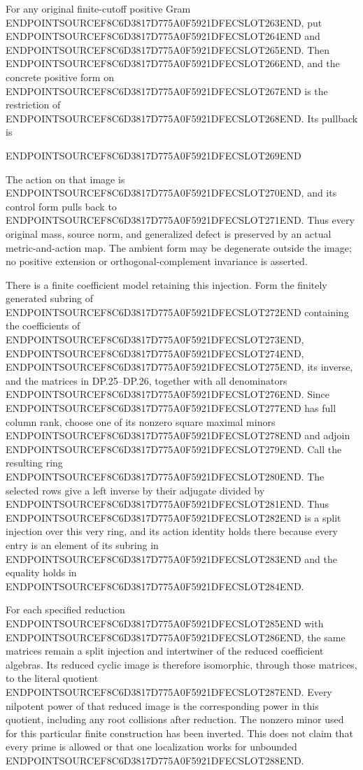 For any original finite-cutoff positive Gram ENDPOINTSOURCEF8C6D3817D775A0F5921DFECSLOT263END, put ENDPOINTSOURCEF8C6D3817D775A0F5921DFECSLOT264END and ENDPOINTSOURCEF8C6D3817D775A0F5921DFECSLOT265END. Then ENDPOINTSOURCEF8C6D3817D775A0F5921DFECSLOT266END, and the concrete positive form on ENDPOINTSOURCEF8C6D3817D775A0F5921DFECSLOT267END is the restriction of ENDPOINTSOURCEF8C6D3817D775A0F5921DFECSLOT268END. Its pullback is

ENDPOINTSOURCEF8C6D3817D775A0F5921DFECSLOT269END

The action on that image is ENDPOINTSOURCEF8C6D3817D775A0F5921DFECSLOT270END, and its control form pulls back to ENDPOINTSOURCEF8C6D3817D775A0F5921DFECSLOT271END. Thus every original mass, source norm, and generalized defect is preserved by an actual metric-and-action map. The ambient form may be degenerate outside the image; no positive extension or orthogonal-complement invariance is asserted.

There is a finite coefficient model retaining this injection. Form the finitely generated subring of ENDPOINTSOURCEF8C6D3817D775A0F5921DFECSLOT272END containing the coefficients of ENDPOINTSOURCEF8C6D3817D775A0F5921DFECSLOT273END, ENDPOINTSOURCEF8C6D3817D775A0F5921DFECSLOT274END, ENDPOINTSOURCEF8C6D3817D775A0F5921DFECSLOT275END, its inverse, and the matrices in DP.25--DP.26, together with all denominators ENDPOINTSOURCEF8C6D3817D775A0F5921DFECSLOT276END. Since ENDPOINTSOURCEF8C6D3817D775A0F5921DFECSLOT277END has full column rank, choose one of its nonzero square maximal minors ENDPOINTSOURCEF8C6D3817D775A0F5921DFECSLOT278END and adjoin ENDPOINTSOURCEF8C6D3817D775A0F5921DFECSLOT279END. Call the resulting ring ENDPOINTSOURCEF8C6D3817D775A0F5921DFECSLOT280END. The selected rows give a left inverse by their adjugate divided by ENDPOINTSOURCEF8C6D3817D775A0F5921DFECSLOT281END. Thus ENDPOINTSOURCEF8C6D3817D775A0F5921DFECSLOT282END is a split injection over this very ring, and its action identity holds there because every entry is an element of its subring in ENDPOINTSOURCEF8C6D3817D775A0F5921DFECSLOT283END and the equality holds in ENDPOINTSOURCEF8C6D3817D775A0F5921DFECSLOT284END.

For each specified reduction ENDPOINTSOURCEF8C6D3817D775A0F5921DFECSLOT285END with ENDPOINTSOURCEF8C6D3817D775A0F5921DFECSLOT286END, the same matrices remain a split injection and intertwiner of the reduced coefficient algebras. Its reduced cyclic image is therefore isomorphic, through those matrices, to the literal quotient ENDPOINTSOURCEF8C6D3817D775A0F5921DFECSLOT287END. Every nilpotent power of that reduced image is the corresponding power in this quotient, including any root collisions after reduction. The nonzero minor used for this particular finite construction has been inverted. This does not claim that every prime is allowed or that one localization works for unbounded ENDPOINTSOURCEF8C6D3817D775A0F5921DFECSLOT288END.

